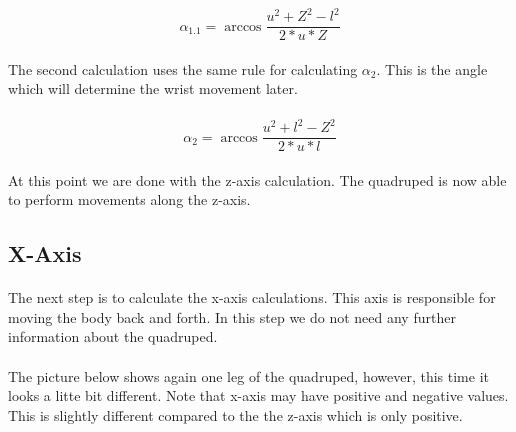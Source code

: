 \documentclass{article}
\begin{document}
    \paragraph{}

    \begin{equation} \label{alpha_1_z}
        \alpha_{1.1} = \arccos \frac{u^2 + Z^2 - l^2}{2 * u * Z} 
    \end{equation}

    \paragraph{}
    The second calculation uses the same rule for calculating $\alpha_2$. This is the angle which will determine the wrist movement later.

    \paragraph{}
    \begin{equation}
        \alpha_2 = \arccos \frac{u^2 + l^2 - Z^2}{2 * u * l} 
    \end{equation}

    \paragraph{}
    At this point we are done with the z-axis calculation. The quadruped is now able to perform movements along the z-axis.



    \subsection{X-Axis}
    \paragraph{} 
    The next step is to calculate the x-axis calculations. This axis is responsible for moving the body back and forth. In this step we do not need any further information about the quadruped.

    \paragraph{}
    The picture below shows again one leg of the quadruped, however, this time it looks a litte bit different. Note that x-axis may have positive and negative values. This is slightly different compared to the the z-axis which is only positive. 
\end{document}
